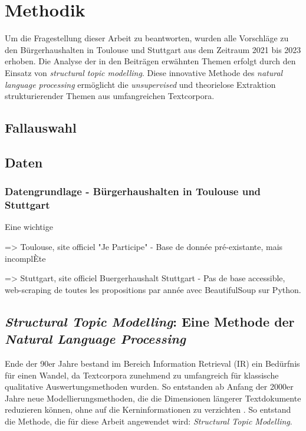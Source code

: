 


\section{Methodik}
Um die Fragestellung dieser Arbeit zu beantworten, wurden alle Vorschläge zu den Bürgerhaushalten in Toulouse und Stuttgart aus dem Zeitraum 2021 bis 2023 erhoben. 
Die Analyse der in den Beiträgen erwähnten Themen erfolgt durch den Einsatz von \textit{structural topic modelling}.
Diese innovative Methode des \textit{natural language processing} ermöglicht die \textit{unsupervised} und theorielose Extraktion strukturierender Themen aus umfangreichen Textcorpora.

\subsection{Fallauswahl}

\subsection{Daten}

\subsubsection{Datengrundlage - Bürgerhaushalten in Toulouse und Stuttgart}

Eine wichtige 

=> Toulouse, site officiel "Je Participe"
    - Base de donnée pré-existante, mais incomplÈte

=> Stuttgart, site officiel Buergerhaushalt Stuttgart
    - Pas de base accessible, web-scraping de toutes les propositions par année avec BeautifulSoup sur Python. 



\subsection{\textit{Structural Topic Modelling}: Eine Methode der \textit{Natural Language Processing}}

Ende der 90er Jahre bestand im Bereich Information Retrieval (IR) ein Bedürfnis für einen Wandel, da Textcorpora zunehmend zu umfangreich für klassische qualitative Auswertungsmethoden wurden.
So entstanden ab Anfang der 2000er Jahre neue Modellierungsmethoden, die die Dimensionen längerer Textdokumente reduzieren können, ohne auf die Kerninformationen zu verzichten \parencite{Heiberger2025STMI}.
So entstand die Methode, die für diese Arbeit angewendet wird: \textit{Structural Topic Modelling}.


